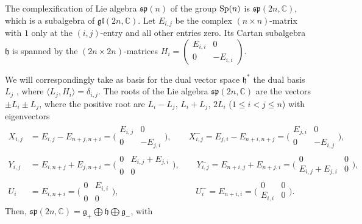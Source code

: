 \documentclass[a4paper,11pt]{amsart}
\numberwithin{equation}{section}
\begin{document}
The complexification of Lie algebra $\mathfrak{sp}(n)$ of the group ${\rm Sp}(n)$ is $\mathfrak{sp}(2n,\mathbb{C})$, which is a subalgebra of $\mathfrak{gl}(2n,\mathbb{C})$. Let $E_{i,j}$ be the complex $(n\times n)$-matrix with $1$ only at the $(i,j)$-entry and all other entries zero. Its Cartan subalgebra $\mathfrak{h}$ is spanned by the $(2n\times2n)$-matrices $H_i = \left(\begin{matrix}E_{i,i}&0\\0&-E_{i,i}\end{matrix}\right)$.

  We will correspondingly take as basis for the dual vector space $\mathfrak{h}^{*}$ the dual basis $L_j$ , where $\langle L_j , H_i\rangle = \delta_{i,j}$.
The roots of the Lie algebra $\mathfrak{sp}({2n},\mathbb{C})$ are the vectors $\pm L_i\pm L_j$, where the positive root are $L_i-L_j$, $L_i+L_j$, $2L_i$ ($1\leq i<j\leq n$) with eigenvectors \cite[Section 16.2]{Fulton}
\begin{equation}\begin{aligned}\label{spn basis}
X_{i,j}&=E_{i,j}-E_{n+j,n+i}=\bigg(\begin{matrix}E_{i,j} &0\\0&-E_{j,i}\end{matrix}\bigg),\qquad X^{-}_{i,j}=E_{j,i}-E_{n+i,n+j}=\bigg(\begin{matrix}E_{j,i} &0\\0&-E_{i,j}\end{matrix}\bigg),\\
Y_{i,j}&=E_{i,n+j}+E_{j,n+i}=\bigg(\begin{matrix}0&E_{i,j}+E_{j,i}\\0&0\end{matrix}\bigg),\qquad Y^{-}_{i,j}=E_{n+i,j}+E_{n+j,i}=\bigg(\begin{matrix}0&0\\E_{i,j}+E_{j,i}&0\end{matrix}\bigg),\\
U_i&=E_{i,n+i}=\bigg(\begin{matrix}0&E_{i,i}\\0&0\end{matrix}\bigg),\qquad\qquad\qquad\quad\qquad
U^{-}_i=E_{n+i,i}=\bigg(\begin{matrix}0&0\\E_{i,i}&0\end{matrix}\bigg).
\end{aligned}\end{equation}
Then, $\mathfrak{sp}(2n,\mathbb{C})=\mathfrak{g}_{+}\bigoplus \mathfrak{h}\bigoplus \mathfrak{g}_{-}$, with
\end{document}
